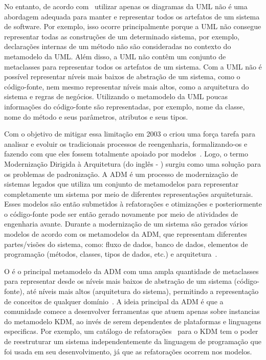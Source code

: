 No entanto, de acordo com~ utilizar apenas os diagramas da UML não é uma abordagem adequada para manter e representar todos os artefatos de um sistema de software. Por exemplo, isso ocorre principalmente porque a UML não consegue representar todas as construções de um determinado sistema, por exemplo, declarações internas de um método não são consideradas no contexto do metamodelo da UML. Além disso, a UML não contêm um conjunto de metaclasses para representar todos os artefatos de um sistema. Com a UML não é possível representar níveis mais baixos de abstração de um sistema, como o código-fonte, nem mesmo representar níveis mais altos, como a arquitetura do sistema e regras de negócios. Utilizando o metamodelo da UML poucas informações do código-fonte são representadas, por exemplo, nome da classe, nome do método e seus parâmetros, atributos e seus tipos.  

Com o objetivo de mitigar essa limitação em 2003 o  criou uma força tarefa para analisar e evoluir os tradicionais processos de reengenharia, formalizando-os e fazendo com que eles fossem totalmente apoiado por modelos~\cite{ADM:OMG}. Logo, o termo Modernização Dirigida à Arquitetura (do inglês - ) surgiu como uma solução para os problemas de padronização. A ADM é um processo de modernização de sistemas legados que utiliza um conjunto de metamodelos para representar completamente um sistema por meio de diferentes representações arquiteturais. Esses modelos são então submetidos à refatorações e otimizações e posteriormente o código-fonte pode ser então gerado novamente por meio de atividades de engenharia avante. Durante a modernização de um sistema são gerados vários modelos de acordo com os metamodelos da ADM, que representam diferentes partes/visões do sistema, como: fluxo de dados, banco de dados, elementos de programação (métodos, classes, tipos de dados, etc.) e arquitetura~\cite{PerezCastillo20121370}.

O  é o principal metamodelo da ADM com uma ampla quantidade de metaclasses para representar desde os níveis mais baixos de abstração de um sistema (código-fonte), até níveis mais altos (arquitetura do sistema), permitindo a representação de conceitos de qualquer domínio~\cite{KDM:specification,KDM:ISO}. A ideia principal da ADM é que a comunidade comece a desenvolver ferramentas que atuem apenas sobre instancias do metamodelo KDM, ao invés de serem dependentes de plataformas e linguagens especificas. Por exemplo, um catálogo de refatorações~\cite{durelli_catalogo} para o KDM tem o poder de reestruturar um sistema independentemente da linguagem de programação que foi usada em seu desenvolvimento, já que as refatorações ocorrem nos modelos.


